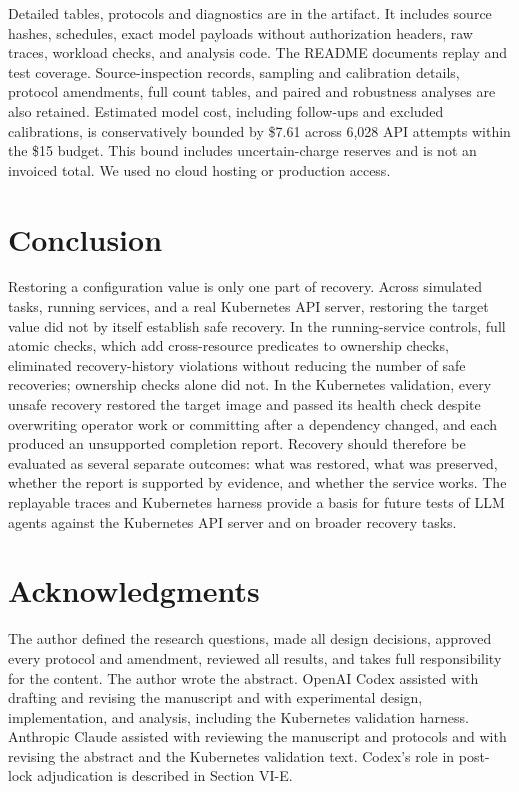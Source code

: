 \documentclass[conference,10pt]{IEEEtran}
\begin{document}
Detailed tables, protocols and diagnostics are in the artifact. It includes source hashes, schedules, exact model payloads without authorization headers, raw traces, workload checks, and analysis code. The README documents replay and test coverage. Source-inspection records, sampling and calibration details, protocol amendments, full count tables, and paired and robustness analyses are also retained. Estimated model cost, including follow-ups and excluded calibrations, is conservatively bounded by \$7.61 across 6,028 API attempts within the \$15 budget. This bound includes uncertain-charge reserves and is not an invoiced total. We used no cloud hosting or production access.

\section{Conclusion}

Restoring a configuration value is only one part of recovery. Across simulated tasks, running services, and a real Kubernetes API server, restoring the target value did not by itself establish safe recovery. In the running-service controls, full atomic checks, which add cross-resource predicates to ownership checks, eliminated recovery-history violations without reducing the number of safe recoveries; ownership checks alone did not. In the Kubernetes validation, every unsafe recovery restored the target image and passed its health check despite overwriting operator work or committing after a dependency changed, and each produced an unsupported completion report. Recovery should therefore be evaluated as several separate outcomes: what was restored, what was preserved, whether the report is supported by evidence, and whether the service works. The replayable traces and Kubernetes harness provide a basis for future tests of LLM agents against the Kubernetes API server and on broader recovery tasks.

\section*{Acknowledgments}

The author defined the research questions, made all design decisions, approved every protocol and amendment, reviewed all results, and takes full responsibility for the content. The author wrote the abstract. OpenAI Codex assisted with drafting and revising the manuscript and with experimental design, implementation, and analysis, including the Kubernetes validation harness. Anthropic Claude assisted with reviewing the manuscript and protocols and with revising the abstract and the Kubernetes validation text. Codex's role in post-lock adjudication is described in Section VI-E.
\end{document}
